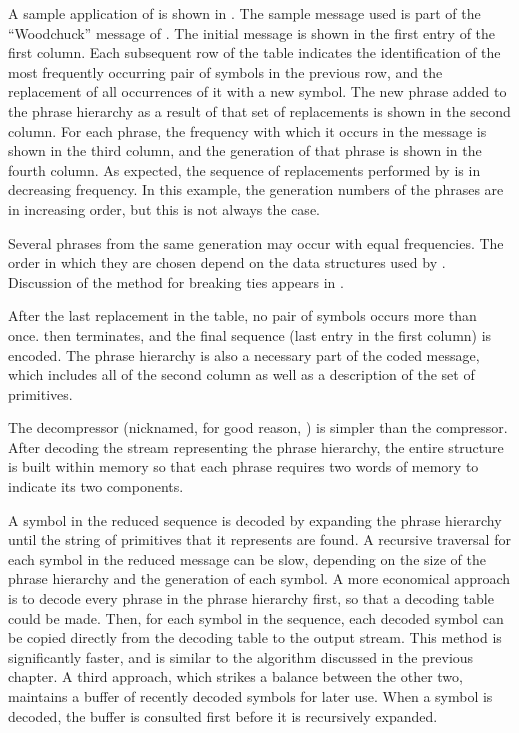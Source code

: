 A sample application of \repair is shown in 
.  The sample message used is 
part of the ``Woodchuck'' message of .
The initial message is shown in the first entry of the first column.
Each subsequent row of the table indicates the identification 
of the most frequently occurring pair of symbols in the previous 
row, and the replacement of all occurrences of it with a new 
symbol.  The new phrase added to the phrase hierarchy as a 
result of that set of replacements is shown in the second column.  
For each phrase, the frequency with which it occurs in the 
message is shown in the third column, and the generation of that 
phrase is shown in the fourth column.  As expected, the 
sequence of replacements performed by \repair is in decreasing 
frequency.  In this example, the generation numbers of the phrases 
are in increasing order, but this is not always the case.



Several phrases from the same generation may occur with
equal frequencies.  The order in which they are chosen depend
on the data structures used by \repair.  Discussion of the 
method for breaking ties appears in .

After the last replacement in the table, no pair of 
symbols occurs more than once.  \repair then terminates, and the 
final sequence (last entry in the first column) is 
encoded.  The phrase hierarchy is also a necessary part of the 
coded message, which includes all of the second column as well 
as a description of the set of primitives.


The \repair decompressor (nicknamed, for good reason, \despair) 
is simpler than the
compressor.  After decoding the stream representing the phrase 
hierarchy, the entire structure is built within memory so that
each phrase requires two words of memory to indicate its two
components.  

A symbol in the reduced sequence is decoded by expanding the
phrase hierarchy until the string of primitives that it 
represents are found.  A recursive traversal for each symbol 
in the reduced message can be slow, depending on the size of
the phrase hierarchy and the generation of each symbol.
A more economical approach
is to decode every phrase in the phrase hierarchy first, 
so that a decoding table could be made.
Then, for each symbol in the sequence, each decoded symbol can be 
copied directly from the decoding table to the output stream.  
This method is significantly 
faster, and is similar to the \lzb algorithm discussed in the 
previous chapter.
A third approach, which strikes a balance between the other two, 
maintains a buffer of recently decoded symbols for later use.  
When a symbol is decoded, the buffer is consulted first before
it is recursively expanded.

